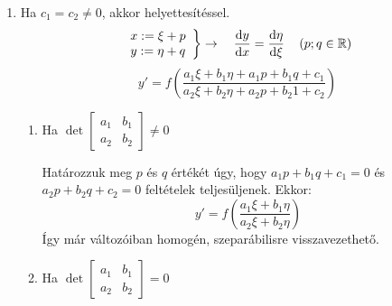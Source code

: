 \documentclass[main.tex]{subfiles}
\begin{document}
\begin{enumerate}
\begin{enumerate}
          \item Ha $c_1 = c_2 \neq 0$, akkor helyettesítéssel.
                \begin{equation*}
                  \left.
                  \begin{array}{l}
                    x := \xi + p \\
                    y := \eta + q
                  \end{array}
                  \right\}
                  \rightarrow
                  \quad
                  \derivative{y}{x} = \derivative{\eta}{\xi}
                  \quad \left( p; q \in \mathbb{R} \right)
                \end{equation*}
                \begin{equation*}
                  y' = f \left(
                  \frac{
                    a_1 \xi + b_1 \eta + a_1 p + b_1 q + c_1
                  }{
                    a_2 \xi + b_2 \eta + a_2 p + b_2 1 + c_2
                  }
                  \right)
                \end{equation*}

                \vspace{1em}
                \begin{multicols}{2}
                  \begin{enumerate}
                    \item Ha $\det\left[\begin{smallmatrix}
                                a_1 & b_1 \\ a_2 & b_2
                              \end{smallmatrix} \right] \neq 0$

                          \vspace{.66em}
                          Határozzuk meg $p$ és $q$ értékét úgy,
                          hogy $a_1 p + b_1 q + c_1 = 0$ és
                          $a_2 p + b_2 q + c_2 = 0$ feltételek
                          teljesüljenek. Ekkor:
                          \[
                            y' =  f \left(
                            \frac{a_1 \xi + b_1 \eta}{a_2 \xi + b_2 \eta}
                            \right)
                          \]
                          Így már változóiban homogén,
                          szeparábilisre visszavezethető.

                    \item Ha $\det\left[\begin{smallmatrix}
                                a_1 & b_1 \\ a_2 & b_2
                              \end{smallmatrix} \right] = 0$


\end{enumerate}
\end{multicols}
\end{enumerate}
\end{enumerate}
\end{document}
